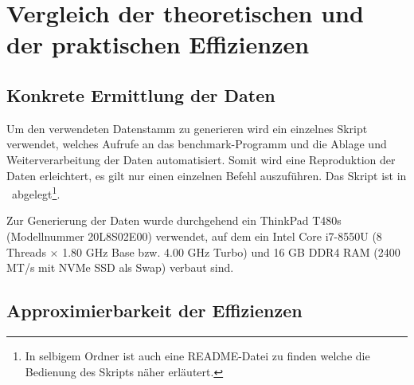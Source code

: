 \chapter{Vergleich der theoretischen und der praktischen Effizienzen}
\label{cha:vergleich}

\section{Konkrete Ermittlung der Daten}

Um den verwendeten Datenstamm zu generieren wird ein einzelnes Skript verwendet, welches Aufrufe an das benchmark-Programm und die Ablage und Weiterverarbeitung der Daten automatisiert. Somit wird eine Reproduktion der Daten erleichtert, es gilt nur einen einzelnen Befehl auszuführen. Das Skript ist in \crScriptsGenerate\ abgelegt\footnote{In selbigem Ordner ist auch eine README-Datei zu finden welche die Bedienung des Skripts näher erläutert.}.

Zur Generierung der Daten wurde durchgehend ein ThinkPad T480s (Modellnummer 20L8S02E00) verwendet, auf dem ein Intel Core i7-8550U (8 Threads $\times$ 1.80 GHz Base bzw. 4.00 GHz Turbo) und 16 GB DDR4 RAM (2400 MT/s mit NVMe SSD als Swap) verbaut sind.

\section{Approximierbarkeit der Effizienzen}


